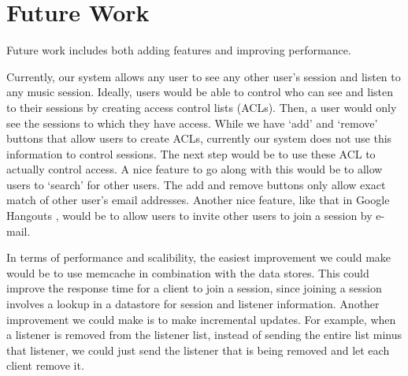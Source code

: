 \section{Future Work}
\label{sec:futurework}
Future work includes both adding features and improving performance.

Currently, our system allows any user to see any other user's session 
and listen to any music session. Ideally, users would be able to control 
who can see and listen to their sessions by creating 
access control lists (ACLs). Then, a user would only see 
the sessions to which they have access. While we have `add' and `remove' 
buttons that allow users to create ACLs, currently our system does not 
use this information to control sessions. The next step would be to 
use these ACL to actually control access. A nice feature to go along with this 
would be to allow users to `search' for other users. The add and remove 
buttons only allow exact match of other user's email addresses. Another nice feature, 
like that in Google Hangouts \cite{googlehangouts}, would be to allow users to 
invite other users to join a session by e-mail. 

In terms of performance and scalibility, the easiest improvement we could make would be 
to use memcache in combination with the data stores. This could improve 
the response time for a client to join a session, since joining a session 
involves a lookup in a datastore for session and listener information. 
Another improvement we could make is to make incremental updates. For example,
when a listener is removed from the listener list, instead of sending the entire 
list minus that listener, we could just send the listener that is being removed and let 
each client remove it. 

